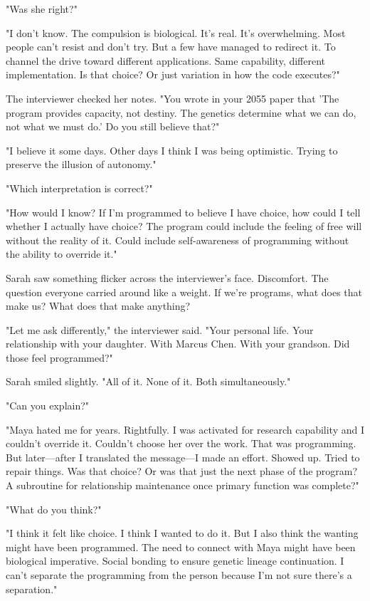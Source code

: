 "Was she right?"

"I don't know. The compulsion is biological. It's real. It's overwhelming. Most people can't resist and don't try. But a few have managed to redirect it. To channel the drive toward different applications. Same capability, different implementation. Is that choice? Or just variation in how the code executes?"

The interviewer checked her notes. "You wrote in your 2055 paper that 'The program provides capacity, not destiny. The genetics determine what we can do, not what we must do.' Do you still believe that?"

"I believe it some days. Other days I think I was being optimistic. Trying to preserve the illusion of autonomy."

"Which interpretation is correct?"

"How would I know? If I'm programmed to believe I have choice, how could I tell whether I actually have choice? The program could include the feeling of free will without the reality of it. Could include self-awareness of programming without the ability to override it."

Sarah saw something flicker across the interviewer's face. Discomfort. The question everyone carried around like a weight. If we're programs, what does that make us? What does that make anything?

"Let me ask differently," the interviewer said. "Your personal life. Your relationship with your daughter. With Marcus Chen. With your grandson. Did those feel programmed?"

Sarah smiled slightly. "All of it. None of it. Both simultaneously."

"Can you explain?"

"Maya hated me for years. Rightfully. I was activated for research capability and I couldn't override it. Couldn't choose her over the work. That was programming. But later—after I translated the message—I made an effort. Showed up. Tried to repair things. Was that choice? Or was that just the next phase of the program? A subroutine for relationship maintenance once primary function was complete?"

"What do you think?"

"I think it felt like choice. I think I wanted to do it. But I also think the wanting might have been programmed. The need to connect with Maya might have been biological imperative. Social bonding to ensure genetic lineage continuation. I can't separate the programming from the person because I'm not sure there's a separation."

